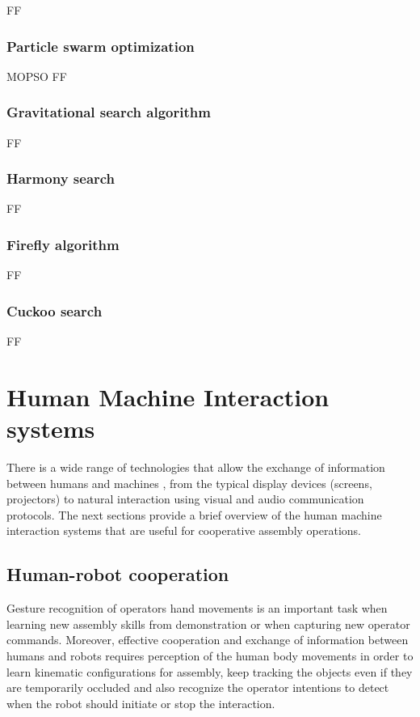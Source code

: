 FF


\subsubsection{Particle swarm optimization}

MOPSO
FF


\subsubsection{Gravitational search algorithm}

FF


\subsubsection{Harmony search}

FF


\subsubsection{Firefly algorithm}

FF


\subsubsection{Cuckoo search}

FF



\section{Human Machine Interaction systems}

There is a wide range of technologies that allow the exchange of information between humans and machines \cite{Goodrich2008}, from the typical display devices (screens, projectors) to natural interaction using visual and audio \cite{Yan2014} communication protocols. The next sections provide a brief overview of the human machine interaction systems that are useful for cooperative assembly operations.



\subsection{Human-robot cooperation}

Gesture recognition of operators hand movements \cite{Oikonomidis2012,Gleeson2013} is an important task when learning new assembly skills from demonstration \cite{Nikolaidis2013} or when capturing new operator commands. Moreover, effective cooperation \cite{Adorno2011} and exchange of information between humans and robots \cite{Pandey2012,Putz2014} requires perception of the human body movements \cite{Roitberg2014} in order to learn kinematic configurations for assembly, keep tracking the objects even if they are temporarily occluded and also recognize the operator intentions to detect when the robot should initiate or stop the interaction.


